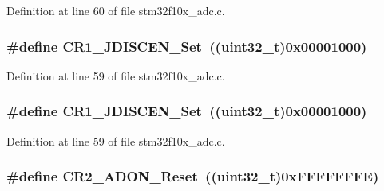 Definition at line 60 of file stm32f10x\+\_\+adc.\+c.

\subsubsection[{\texorpdfstring{C\+R1\+\_\+\+J\+D\+I\+S\+C\+E\+N\+\_\+\+Set}{CR1_JDISCEN_Set}}]{\setlength{\rightskip}{0pt plus 5cm}\#define C\+R1\+\_\+\+J\+D\+I\+S\+C\+E\+N\+\_\+\+Set~(({\bf uint32\+\_\+t})0x00001000)}\hypertarget{group___a_d_c___private___defines_gafef4d16c890bf5e6eb381ad01c829309}{}\label{group___a_d_c___private___defines_gafef4d16c890bf5e6eb381ad01c829309}


Definition at line 59 of file stm32f10x\+\_\+adc.\+c.

\subsubsection[{\texorpdfstring{C\+R1\+\_\+\+J\+D\+I\+S\+C\+E\+N\+\_\+\+Set}{CR1_JDISCEN_Set}}]{\setlength{\rightskip}{0pt plus 5cm}\#define C\+R1\+\_\+\+J\+D\+I\+S\+C\+E\+N\+\_\+\+Set~(({\bf uint32\+\_\+t})0x00001000)}\hypertarget{group___a_d_c___private___defines_gafef4d16c890bf5e6eb381ad01c829309}{}\label{group___a_d_c___private___defines_gafef4d16c890bf5e6eb381ad01c829309}


Definition at line 59 of file stm32f10x\+\_\+adc.\+c.

\subsubsection[{\texorpdfstring{C\+R2\+\_\+\+A\+D\+O\+N\+\_\+\+Reset}{CR2_ADON_Reset}}]{\setlength{\rightskip}{0pt plus 5cm}\#define C\+R2\+\_\+\+A\+D\+O\+N\+\_\+\+Reset~(({\bf uint32\+\_\+t})0x\+F\+F\+F\+F\+F\+F\+F\+E)}\hypertarget{group___a_d_c___private___defines_gaa3eb5d77998387159508a57d7e09f459}{}\label{group___a_d_c___private___defines_gaa3eb5d77998387159508a57d7e09f459}


